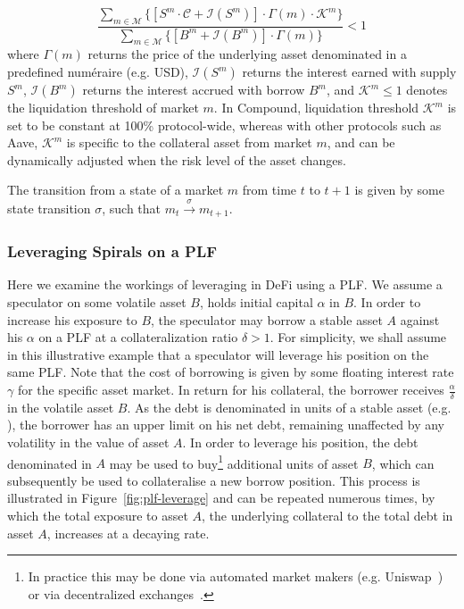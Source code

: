 \begin{equation}
    \frac{\sum_{m\in \mathcal{M}}
    \Big\{\left[S^{m} \cdot \mathcal{C} + \mathcal{I}(S^m)\right] \cdot \Gamma(m) \cdot \mathcal{K}^m \Big\}
    }{
    \sum_{m\in \mathcal{M}} \Big\{\left[B^m + \mathcal{I}(B^m)\right] \cdot \Gamma(m)\Big\}}
    < 1
    \label{eq:liqcond}
\end{equation}
where $\Gamma(m)$ returns the price of the underlying asset denominated in a predefined numéraire (e.g. USD), $\mathcal{I}(S^m)$ returns the interest earned with supply $S^m$, $\mathcal{I}(B^m)$ returns the interest accrued with borrow $B^m$, and $\mathcal{K}^m \leq 1$ denotes the liquidation threshold of market $m$. In Compound, liquidation threshold $\mathcal{K}^m$ is set to be constant at 100\% protocol-wide, whereas with other protocols such as Aave, $\mathcal{K}^m$ is specific to the collateral asset from market $m$, and can be dynamically adjusted when the risk level of the asset changes. 


The transition from a state of a market $m$ from time $t$ to $t+1$ is given by some state transition $\sigma$, such that $m_{t}\xrightarrow[]{\sigma}m_{t+1}$. 

\subsubsection{Leveraging Spirals on a PLF}
\label{ssec:leveraging-spirals-meth}
Here we examine the workings of leveraging in DeFi using a PLF. 
We assume a speculator on some volatile asset $B$, holds initial capital $\alpha$ in $B$.
In order to increase his exposure to $B$, the speculator may borrow a stable asset $A$ against his $\alpha$ on a PLF at a collateralization ratio $\delta>1$.
For simplicity, we shall assume in this illustrative example that a speculator will leverage his position on the same PLF.
Note that the cost of borrowing is given by some floating interest rate $\gamma$ for the specific asset market.
In return for his collateral, the borrower receives $\frac{\alpha}{\delta}$ in the volatile asset $B$.
As the debt is denominated in units of a stable asset (e.g. ), the borrower has an upper limit on his net debt, remaining unaffected by any volatility in the value of asset $A$.
In order to leverage his position, the debt denominated in $A$ may be used to buy\footnote{In practice this may be done via automated market makers \cite{xu2021dexamm} (e.g. Uniswap~\cite{whitepaper:uniswap}) or via decentralized exchanges~\cite{web:dydx}.} additional units of asset $B$, which can subsequently be used to collateralise a new borrow position.
This process is illustrated in Figure~\ref{fig:plf-leverage} and can be repeated numerous times, by which the total exposure to asset $A$, the underlying collateral to the total debt in asset $A$, increases at a decaying rate.

